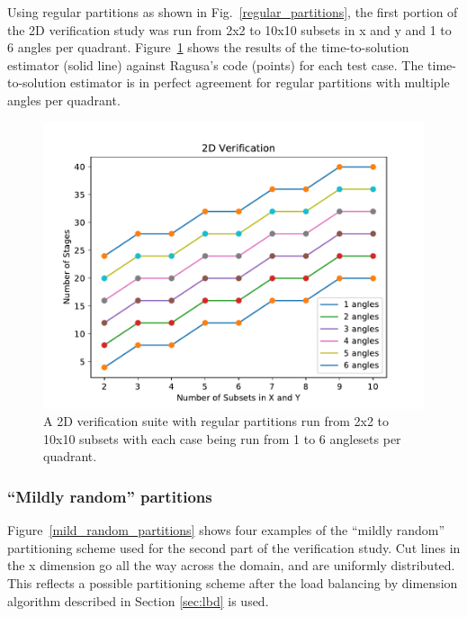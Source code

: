 \documentclass[times,final]{elsarticle}
\begin{document}
Using regular partitions as shown in Fig.~\ref{regular_partitions}, the first portion of the 2D verification study was run from 2x2 to 10x10 subsets in x and y and 1 to 6 angles per quadrant.  Figure~\ref{regular_verification} shows the results of the time-to-solution estimator (solid line) against Ragusa's code (points) for each test case. The time-to-solution estimator is in perfect agreement for regular partitions with multiple angles per quadrant.

\begin{figure}[H]
\centering
\includegraphics[scale=0.8]{../figures/regular_verification.pdf}
\caption{A 2D verification suite with regular partitions run from 2x2 to 10x10 subsets with each case being run from 1 to 6 anglesets per quadrant.}
\label{regular_verification}
\end{figure}

\subsubsection{``Mildly random'' partitions}
Figure~\ref{mild_random_partitions} shows four examples of the ``mildly random'' partitioning scheme used for the second part of the verification study. Cut lines in the x dimension go all the way across the domain, and are uniformly distributed. This reflects a possible partitioning scheme after the load balancing by dimension algorithm described in Section \ref{sec:lbd} is used.
\end{document}
